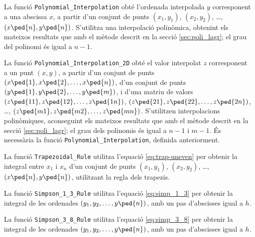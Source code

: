 La funció \texttt{Polynomial\_Interpolation} obté l'ordenada interpolada $y$ corresponent a una abscissa $x$, a partir d'un conjunt  de punts $(x_1,y_1)$, $(x_2,y_2)$, \ldots, $(x\ped{n},y\ped{n})$. S'utilitza una interpolació polinòmica, obtenint els mateixos resultats que amb el mètode descrit en la secció \vref{sec:poli_lagr}; el grau del polinomi és igual a $n-1$.




La funció \texttt{Polynomial\_Interpolation\_2D} obté el valor interpolat $z$ corresponent a un punt $(x, y)$, a partir d'un conjunt de punts $(x\ped{1}, x\ped{2}, \ldots, x\ped{n})$, d'un conjunt de punts $(y\ped{1}, y\ped{2}, \ldots, y\ped{m})$, i d'una matriu de valors $(z\ped{11}, z\ped{12}, \ldots, z\ped{1n})$,
$(z\ped{21}, z\ped{22}, \ldots, z\ped{2n})$, \ldots, $(z\ped{m1}, z\ped{m2}, \ldots, z\ped{mn})$. S'utilitzen  interpolacions polinòmiques, aconseguint els mateixos resultats que amb el mètode descrit en la secció \vref{sec:poli_lagr}; el grau dels polinomis és igual a $n-1$ i $m-1$.
És necessària la funció \texttt{Polynomial\_Interpolation}, definida anteriorment.




La funció \texttt{Trapezoidal\_Rule} utilitza l'equació  \eqref{eq:trap-uneven} per obtenir la integral entre $x_1$ i $x_n$ d'un conjunt  de punts $(x_1,y_1)$, $(x_2,y_2)$, \ldots, $(x\ped{n},y\ped{n})$, utilitzant la regla dels trapezis.




La funció \texttt{Simpson\_1\_3\_Rule} utilitza l'equació  \eqref{eq:simp_1_3} per obtenir la integral de les ordenades $(y_1, y_2, \dots, y\ped{n})$, amb un pas d'abscisses igual a $h$.




La funció \texttt{Simpson\_3\_8\_Rule} utilitza l'equació  \eqref{eq:simp_3_8} per obtenir la integral de les ordenades $(y_1, y_2, \dots, y\ped{n})$, amb un pas d'abscisses igual a $h$.


